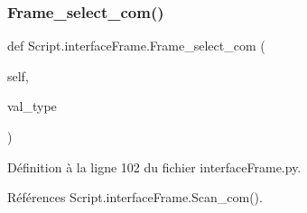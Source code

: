 \mbox{\label{namespaceScript_1_1interfaceFrame_a3538cb8357b74776a380240ed3221bc0}} 
\subsubsection{\texorpdfstring{Frame\+\_\+select\+\_\+com()}{Frame\_select\_com()}}
{\footnotesize\ttfamily def Script.\+interface\+Frame.\+Frame\+\_\+select\+\_\+com (\begin{DoxyParamCaption}\item[{}]{self,  }\item[{}]{val\+\_\+type }\end{DoxyParamCaption})}



Définition à la ligne 102 du fichier interface\+Frame.\+py.



Références Script.\+interface\+Frame.\+Scan\+\_\+com().


